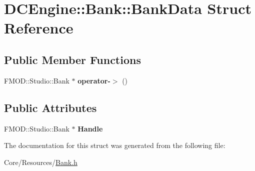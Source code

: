 \hypertarget{structDCEngine_1_1Bank_1_1BankData}{\section{D\-C\-Engine\-:\-:Bank\-:\-:Bank\-Data Struct Reference}
\label{structDCEngine_1_1Bank_1_1BankData}
}
\subsection*{Public Member Functions}
\begin{DoxyCompactItemize}
\item 
\hypertarget{structDCEngine_1_1Bank_1_1BankData_ad8fd6d8a38346570edfa8a2f587581d9}{F\-M\-O\-D\-::\-Studio\-::\-Bank $\ast$ {\bfseries operator-\/$>$} ()}\label{structDCEngine_1_1Bank_1_1BankData_ad8fd6d8a38346570edfa8a2f587581d9}

\end{DoxyCompactItemize}
\subsection*{Public Attributes}
\begin{DoxyCompactItemize}
\item 
\hypertarget{structDCEngine_1_1Bank_1_1BankData_a017a1997f17dc383b4e1dc2a4e782bc5}{F\-M\-O\-D\-::\-Studio\-::\-Bank $\ast$ {\bfseries Handle}}\label{structDCEngine_1_1Bank_1_1BankData_a017a1997f17dc383b4e1dc2a4e782bc5}

\end{DoxyCompactItemize}


The documentation for this struct was generated from the following file\-:\begin{DoxyCompactItemize}
\item 
Core/\-Resources/\hyperlink{Bank_8h}{Bank.\-h}\end{DoxyCompactItemize}
